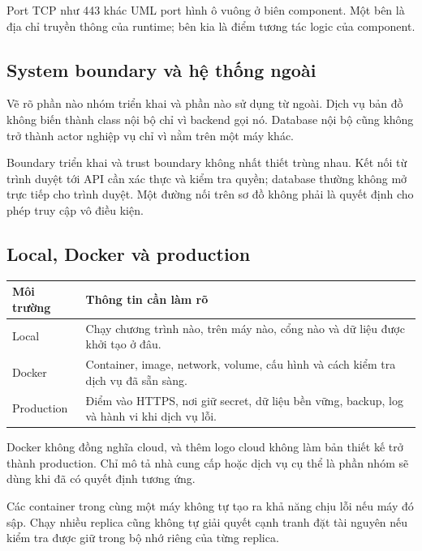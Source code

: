 Port TCP như 443 khác UML port hình ô vuông ở biên component. Một bên là địa chỉ truyền thông của runtime; bên kia là điểm tương tác logic của component.

\subsection{System boundary và hệ thống ngoài}
Vẽ rõ phần nào nhóm triển khai và phần nào sử dụng từ ngoài. Dịch vụ bản đồ không biến thành class nội bộ chỉ vì backend gọi nó. Database nội bộ cũng không trở thành actor nghiệp vụ chỉ vì nằm trên một máy khác.

Boundary triển khai và trust boundary không nhất thiết trùng nhau. Kết nối từ trình duyệt tới API cần xác thực và kiểm tra quyền; database thường không mở trực tiếp cho trình duyệt. Một đường nối trên sơ đồ không phải là quyết định cho phép truy cập vô điều kiện.

\subsection{Local, Docker và production}
\begin{center}\begin{tabularx}{\linewidth}{|L{29mm}|Y|}\hline
\textbf{Môi trường} & \textbf{Thông tin cần làm rõ}\\\hline
Local & Chạy chương trình nào, trên máy nào, cổng nào và dữ liệu được khởi tạo ở đâu.\\\hline
Docker & Container, image, network, volume, cấu hình và cách kiểm tra dịch vụ đã sẵn sàng.\\\hline
Production & Điểm vào HTTPS, nơi giữ secret, dữ liệu bền vững, backup, log và hành vi khi dịch vụ lỗi.\\\hline
\end{tabularx}\end{center}
Docker không đồng nghĩa cloud, và thêm logo cloud không làm bản thiết kế trở thành production. Chỉ mô tả nhà cung cấp hoặc dịch vụ cụ thể là phần nhóm sẽ dùng khi đã có quyết định tương ứng.

Các container trong cùng một máy không tự tạo ra khả năng chịu lỗi nếu máy đó sập. Chạy nhiều replica cũng không tự giải quyết cạnh tranh đặt tài nguyên nếu kiểm tra được giữ trong bộ nhớ riêng của từng replica.

